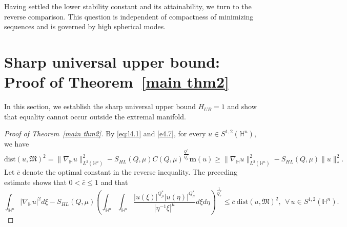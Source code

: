 \documentclass[10pt,a4paper]{amsart}
\begin{document}
Having settled the lower stability constant and its attainability, we turn to the reverse comparison. This question is independent of compactness of minimizing sequences and is governed by high spherical modes.

\section{\texorpdfstring{{Sharp universal upper bound: Proof of Theorem~\ref{main thm2}}}{Sharp universal upper bound: Proof of Theorem 3.3}}\label{sec6}

In this section, we establish the sharp universal upper bound $H_{UB}=1$ and show that equality cannot occur outside the extremal manifold.

\begin{proof}
[Proof of Theorem~\ref{main thm2}]
{By \eqref{eq:l4.1} and \eqref{e4.7}, for every $u\in S^{1,2}(\mathbb H^n)$, we have}
\begin{equation*}
 \mathrm{dist}(u,\mathfrak{M})^2=\|\nabla_\mathbb{H} u\|_{L^2(\mathbb{H}^n)}^2-S_{HL}(Q,\mu)C(Q,\mu)^{\frac{Q^{\ast}}{Q^{\ast}_{\mu}}}\mathbf{m}(u)\geq
 \|\nabla_\mathbb{H} u\|_{L^2(\mathbb{H}^n)}^2-S_{HL}(Q,\mu) \|u\|_*^2.
\end{equation*}
{Let $\bar c$ denote the optimal constant in the reverse inequality. The preceding estimate shows that $0<\bar c\leq1$ and that}
\begin{equation}\label{uppmini}
 \int_{\mathbb{H}^{n}}|\nabla_{\mathbb{H}} u|^{2}{d}\xi-S_{HL}(Q,\mu) \left(\int_{\mathbb{H}^{n}}\int_{\mathbb{H}^{n}}\frac{|u(\xi)|^{Q^{\ast}_{\mu}}|u(\eta)|
^{Q^{\ast}_{\mu}}}{|\eta^{-1}\xi|^{\mu}}{d}\xi{d}\eta\right)^{\frac{1}{Q^{\ast}_{\mu}}}\leq \bar{c}\ \mathrm{dist}(u,\mathfrak{M})^2,\ \ \forall \, u\in S^{1,2}(\mathbb{H}^{n}).
\end{equation}


\end{proof}
\end{document}
